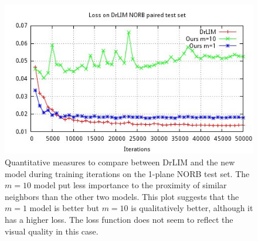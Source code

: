 \documentclass[a4paper,12pt]{report}
\begin{document}
\begin{figure}[h]
    \begin{center}
        \includegraphics{thesis_figures/final_loss_testv3.jpg}
    \end{center}
    \caption{Quantitative measures to compare between DrLIM and the new model during training iterations on the 1-plane NORB test set.
    The $m=10$ model put less importance to the proximity of similar neighbors than the other two models.
    This plot suggests that the $m=1$ model is better but $m=10$ is qualitatively better, although it has a higher loss.
    The loss function does not seem to reflect the visual quality in this case.
    }
    \label{fig:loss_norb_test_common}
\end{figure}
\end{document}
